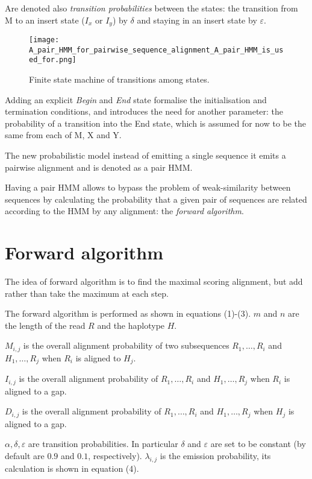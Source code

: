 \documentclass{article}
\begin{document}
Are denoted also \emph{transition probabilities} between the states: the transition from M to an insert state ($I_x$ or $I_y$) by $\delta$ and staying in an insert state by $\varepsilon$.

\begin{figure}[h]
    \centering
    \texttt{[image: A\_pair\_HMM\_for\_pairwise\_sequence\_alignment\_A\_pair\_HMM\_is\_used\_for.png]}
    \caption{Finite state machine of transitions among states.}
    \label{fig:probabilistic_model}
\end{figure}

Adding an explicit \emph{Begin} and \emph{End} state formalise the initialisation and termination conditions, and introduces the need for another parameter: the probability of a transition into the End state, which is assumed for now to be the same from each of M, X and Y.

The new probabilistic model instead of emitting a single sequence it emits a pairwise alignment and is denoted as a pair HMM.

Having a pair HMM allows to bypass the problem of weak-similarity between sequences by calculating the probability that a given pair of sequences are related according to the HMM by any alignment: the \emph{forward algorithm}.

\newpage

\section{Forward algorithm}

The idea of forward algorithm is to find the maximal scoring alignment, but add rather than take the maximum at each step.

The forward algorithm is performed as shown in equations (1)-(3). $m$ and $n$ are the length of the read $R$ and the haplotype $H$.

$M_{i,j}$ is the overall alignment probability of two subsequences $R_{1},\ldots,R_{i}$ and $H_{1},\ldots,R_{j}$ when $R_{i}$ is aligned to $H_{j}$.

$I_{i,j}$ is the overall alignment probability of $R_{1},\ldots,R_{i}$ and $H_{1},\ldots,R_{j}$ when $R_{i}$ is aligned to a gap.

$D_{i,j}$ is the overall alignment probability of $R_{1},\ldots,R_{i}$ and $H_{1},\ldots,R_{j}$ when $H_{j}$ is aligned to a gap.

$\alpha, \delta, \varepsilon$ are transition probabilities. In particular $\delta$ and $\varepsilon$ are set to be constant (by default are $0.9$ and $0.1$, respectively). $\lambda_{i,j}$ is the emission probability, its calculation is shown in equation (4).
\end{document}
